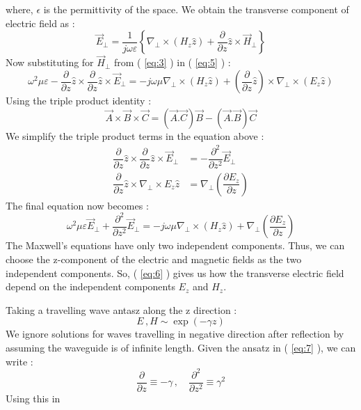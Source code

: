 \documentclass[12pt]{article}
\newcommand*{\myref}[1]{%
  \begingroup
    \hypersetup{
      linkcolor=linkequation,
      linkbordercolor=linkequation,
    }%
    \ref{#1}%
  \endgroup
}
\begin{document}
where, $\epsilon$ is the permittivity of the space. \linebreak
We obtain the transverse component of electric field as :
\begin{equation}
  \vec{E}_{\perp} = \dfrac{1}{j\omega \varepsilon} \left\{ \nabla_{\perp}\times \left( H_z \hat{z} \right)+\dfrac{\partial}{\partial z}\hat{z}\times \vec{H}_{\perp} \right\} \label{eq:5}
\end{equation}
Now substituting for $\vec{H}_{\perp}$ from (\myref{eq:3}) in (\myref{eq:5}) :
\begin{equation*}
  \omega^2 \mu \varepsilon - \dfrac{\partial}{\partial z} \hat{z}\times \dfrac{\partial}{\partial z} \hat{z} \times \vec{E}_{\perp} = -j\omega \mu \nabla_{\perp} \times \left( H_z \hat{z} \right)+\left( \dfrac{\partial}{\partial z}\hat{z} \right) \times \nabla_{\perp} \times \left( E_z \hat{z} \right)
\end{equation*}
Using the triple product identity :
\begin{equation*}
  \vec{A}\times \vec{B}\times \vec{C}=\left( \vec{A}.\vec{C} \right)\vec{B}-\left( \vec{A}.\vec{B} \right)\vec{C}
\end{equation*}
We simplify the triple product terms in the equation above :
\begin{align*}
  \dfrac{\partial}{\partial z}\hat{z}\times \dfrac{\partial}{\partial z} \hat{z} \times \vec{E}_{\perp} &= - \dfrac{\partial^2}{\partial z^2}\vec{E}_{\perp} \\
  \dfrac{\partial}{\partial z}\hat{z}\times \nabla_{\perp}\times E_z \hat{z} &= \nabla_{\perp} \left( \dfrac{\partial E_z}{\partial z} \right)
\end{align*}
The final equation now becomes :
\begin{equation}
  \omega^2 \mu \varepsilon \vec{E}_{\perp} +\dfrac{\partial^2}{\partial z^2}\vec{E}_{\perp} = -j\omega \mu \nabla_{\perp}\times \left( H_z \hat{z} \right)+\nabla_{\perp} \left( \dfrac{\partial E_z}{\partial z} \right) \label{eq:6}
\end{equation}
The Maxwell's equations have only two independent components. Thus, we can choose the z-component of the electric and magnetic fields as the two independent components. So, (\myref{eq:6}) gives us how the transverse electric field depend on the independent components $E_z$ and $H_z$. \linebreak

Taking a travelling wave antasz along the z direction :
\begin{equation}
  E\, , H \sim \exp(-\gamma z) \label{eq:7}
\end{equation}
We ignore solutions for waves travelling in negative direction after reflection by assuming the waveguide is of infinite length. \linebreak
Given the ansatz in (\myref{eq:7}), we can write :
\begin{equation*}
  \dfrac{\partial}{\partial z} \equiv -\gamma \, , \quad \dfrac{\partial^2}{\partial z^2} \equiv \gamma^2
\end{equation*}
Using this in 
\end{document}
